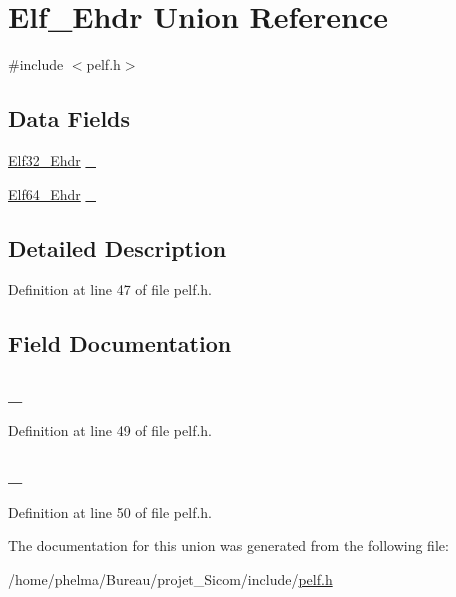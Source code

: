 \hypertarget{union_elf___ehdr}{\section{Elf\-\_\-\-Ehdr Union Reference}
\label{union_elf___ehdr}
}


{\ttfamily \#include $<$pelf.\-h$>$}

\subsection*{Data Fields}
\begin{DoxyCompactItemize}
\item 
\hyperlink{struct_elf32___ehdr}{Elf32\-\_\-\-Ehdr} \hyperlink{union_elf___ehdr_a2d857c51ae17f204f8acb435fec2e0e4}{\-\_}
\item 
\hyperlink{struct_elf64___ehdr}{Elf64\-\_\-\-Ehdr} \hyperlink{union_elf___ehdr_a939e90963b70486db444960aab3057df}{\-\_}
\end{DoxyCompactItemize}


\subsection{Detailed Description}


Definition at line 47 of file pelf.\-h.



\subsection{Field Documentation}
\hypertarget{union_elf___ehdr_a2d857c51ae17f204f8acb435fec2e0e4}{
\subsubsection[{\-\_\-32}]{ \-\_}}\label{union_elf___ehdr_a2d857c51ae17f204f8acb435fec2e0e4}


Definition at line 49 of file pelf.\-h.

\hypertarget{union_elf___ehdr_a939e90963b70486db444960aab3057df}{
\subsubsection[{\-\_\-64}]{ \-\_}}\label{union_elf___ehdr_a939e90963b70486db444960aab3057df}


Definition at line 50 of file pelf.\-h.



The documentation for this union was generated from the following file\-:\begin{DoxyCompactItemize}
\item 
/home/phelma/\-Bureau/projet\-\_\-\-Sicom/include/\hyperlink{pelf_8h}{pelf.\-h}\end{DoxyCompactItemize}
